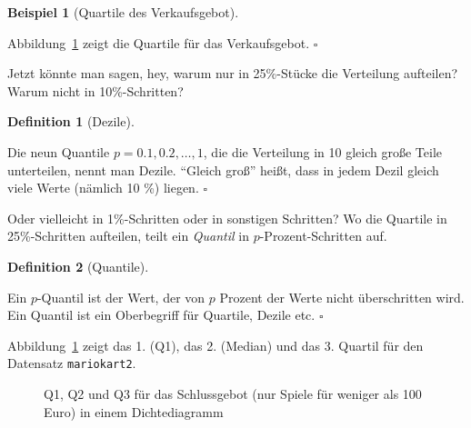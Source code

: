 \documentclass[
  letterpaper,
  twoside,
  open=any]{scrbook}
\theoremstyle{definition}
\theoremstyle{definition}
\newtheorem{example}{Beispiel}[chapter]
\theoremstyle{definition}
\newtheorem{definition}{Definition}[chapter]
\theoremstyle{remark}
\begin{document}
\begin{example}[Quartile des
Verkaufsgebot]\protect\hypertarget{exm-mario-qs}{}\label{exm-mario-qs}

Abbildung~\ref{fig-mario-qs1} zeigt die Quartile für das Verkaufsgebot.
\(\square\)

\end{example}

Jetzt könnte man sagen, hey, warum nur in 25\%-Stücke die Verteilung
aufteilen? Warum nicht in 10\%-Schritten?

\begin{definition}[Dezile]\protect\hypertarget{def-dezile}{}\label{def-dezile}

Die neun Quantile \(p= 0.1, 0.2, \ldots, 1\), die die Verteilung in 10
gleich große Teile unterteilen, nennt man Dezile. \enquote{Gleich groß}
heißt, dass in jedem Dezil gleich viele Werte (nämlich 10 \%) liegen.
\(\square\)

\end{definition}

Oder vielleicht in 1\%-Schritten oder in sonstigen Schritten? Wo die
Quartile in 25\%-Schritten aufteilen, teilt ein \emph{Quantil} in
\(p\)-Prozent-Schritten auf.

\begin{definition}[Quantile]\protect\hypertarget{def-quantile}{}\label{def-quantile}

Ein \(p\)-Quantil ist der Wert, der von \(p\) Prozent der Werte nicht
überschritten wird. Ein Quantil ist ein Oberbegriff für Quartile, Dezile
etc. \(\square\)

\end{definition}

Abbildung~\ref{fig-mario-qs1} zeigt das 1. (Q1), das 2. (Median) und das
3. Quartil für den Datensatz \texttt{mariokart2}.

\begin{figure}


\caption{\label{fig-mario-qs1}Q1, Q2 und Q3 für das Schlussgebot (nur
Spiele für weniger als 100 Euro) in einem Dichtediagramm}

\end{figure}%
\end{document}
